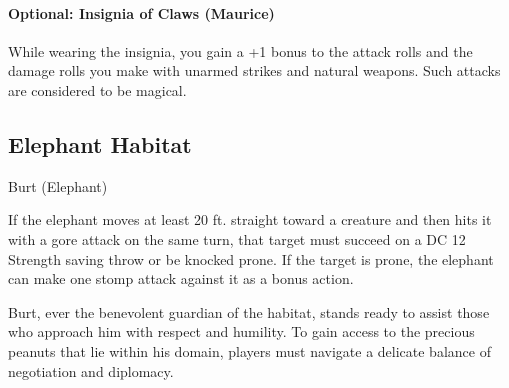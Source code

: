 \paragraph*{Optional: Insignia of Claws (Maurice)}
While wearing the insignia, you gain a +1 bonus to the attack rolls and the damage rolls you make with unarmed strikes and natural weapons. Such attacks are considered to be magical.

\subsection*{ Elephant Habitat}
\begin{DndMonster}[width=0.5\textwidth]{Burt (Elephant)}

	\DndMonsterBasics[
		armor-class = {15 (Natural Armor)},
		hit-points  = {\DndDice{10d12 + 30}},
		speed       = {40 ft.},
	]

	\renewcommand{\AbilityScoreSpacer}{~}

	\DndMonsterAbilityScores[
		str = 22,
		dex = 9,
		con = 17,
		int = 3,
		wis = 11,
		cha = 6,
	]

	\DndMonsterDetails[
		senses = {passive Perception 10},
		languages = {Common},
		challenge = 5,
	]

	If the elephant moves at least 20 ft. straight toward a creature and then hits it with a gore attack on the same turn, that target must succeed on a DC 12 Strength saving throw or be knocked prone. If the target is prone, the elephant can make one stomp attack against it as a bonus action.
	

	\DndMonsterAttack[
		name=Gore,
		distance=melee, %
		mod=+8,
		reach=5,
		targets=one target,
		dmg={\DndDice{3d8 + 6}},
		dmg-type=piercing,
	]
	
	\DndMonsterAttack[
		name=Stomp,
		distance=melee, %
		mod=+8,
		reach=5,
		targets=one prone target,
		dmg={\DndDice{3d10 + 6}},
		dmg-type=bludgeoning,
	]
\end{DndMonster}
\noindent Burt, ever the benevolent guardian of the habitat, stands ready to assist those who approach him with respect and humility. To gain access to the precious peanuts that lie within his domain, players must navigate a delicate balance of negotiation and diplomacy.

